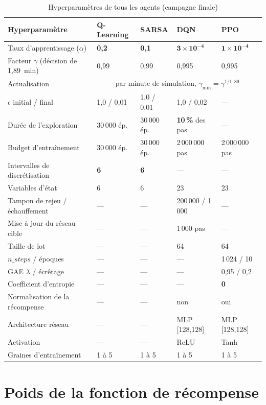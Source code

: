 \documentclass[11pt,a4paper]{report}
\begin{document}
\begin{table}[H]
\centering
\caption{Hyperparamètres de tous les agents (campagne finale)}
\small
\begin{tabular}{lllll}
\toprule
\textbf{Hyperparamètre} & \textbf{Q-Learning} & \textbf{SARSA} & \textbf{DQN} & \textbf{PPO} \\
\midrule
Taux d'apprentissage ($\alpha$) & \textbf{0,2} & \textbf{0,1} & $\mathbf{3\times10^{-4}}$ & $\mathbf{1\times10^{-4}}$ \\
Facteur $\gamma$ (décision de 1,89~min) & 0,99 & 0,99 & 0,995 & 0,995 \\
Actualisation & \multicolumn{4}{c}{par minute de simulation, $\gamma_{\min} = \gamma^{1/1{,}89}$} \\
$\epsilon$ initial / final & 1,0 / 0,01 & 1,0 / 0,01 & 1,0 / 0,02 & --- \\
Durée de l'exploration & 30\,000 ép. & 30\,000 ép. & \textbf{10\,\%} des pas & --- \\
Budget d'entraînement & 30\,000 ép. & 30\,000 ép. & 2\,000\,000 pas & 2\,000\,000 pas \\
Intervalles de discrétisation & \textbf{6} & \textbf{6} & --- & --- \\
Variables d'état & 6 & 6 & 23 & 23 \\
Tampon de rejeu / échauffement & --- & --- & 200\,000 / 1\,000 & --- \\
Mise à jour du réseau cible & --- & --- & 1\,000 pas & --- \\
Taille de lot & --- & --- & 64 & 64 \\
$n\_steps$ / époques & --- & --- & --- & 1\,024 / 10 \\
GAE $\lambda$ / écrêtage & --- & --- & --- & 0,95 / 0,2 \\
Coefficient d'entropie & --- & --- & --- & \textbf{0} \\
Normalisation de la récompense & --- & --- & non & oui \\
Architecture réseau & --- & --- & MLP [128,128] & MLP [128,128] \\
Activation & --- & --- & ReLU & Tanh \\
Graines d'entraînement & 1 à 5 & 1 à 5 & 1 à 5 & 1 à 5 \\
\bottomrule
\end{tabular}
\end{table}

\section*{Poids de la fonction de récompense}
\end{document}
